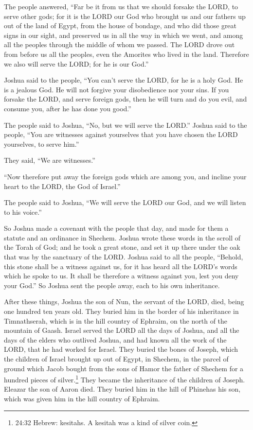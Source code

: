 \myverse{}The people answered, “Far be it from us that we should forsake
the LORD, to serve other gods;
\myverse{}for it is the LORD our God who brought us and our fathers up out of the land
of Egypt, from the house of bondage, and who did those great signs in our sight, and preserved us in all
the way in which we went, and among all the peoples through the middle of whom we passed.
\myverse{}The LORD drove out from before us all the peoples, even the Amorites who
lived in the land. Therefore we also will serve the LORD; for he is our God.”

\myverse{}Joshua said to the people, “You can’t serve the LORD, for he
is a holy God. He is a jealous God. He will not forgive your disobedience nor your sins.
\myverse{}If you forsake the LORD, and serve foreign gods, then he will turn and do
you evil, and consume you, after he has done you good.”

\myverse{}The people said to Joshua, “No, but we will serve the LORD.”
\myverse{}Joshua said to the people, “You are witnesses against yourselves that you
have chosen the LORD yourselves, to serve him.”

They said, “We are witnesses.”

\myverse{}“Now therefore put away the foreign gods which are among you,
and incline your heart to the LORD, the God of Israel.”

\myverse{}The people said to Joshua, “We will serve the LORD our God,
and we will listen to his voice.”

\myverse{}So Joshua made a covenant with the people that day, and made
for them a statute and an ordinance in Shechem.
\myverse{}Joshua wrote these words in the scroll of the Torah of God; and he took a
great stone, and set it up there under the oak that was by the sanctuary of the LORD.
\myverse{}Joshua said to all the people, “Behold, this stone shall be a witness against
us, for it has heard all the LORD’s words which he spoke to us. It shall be therefore a witness against
you, lest you deny your God.”
\myverse{}So Joshua sent the people away, each to his own inheritance.

\myverse{}After these things, Joshua the son of Nun, the servant of the
LORD, died, being one hundred ten years old.
\myverse{}They buried him in the border of his inheritance in Timnathserah, which is
in the hill country of Ephraim, on the north of the mountain of Gaash.
\myverse{}Israel served the LORD all the days of Joshua, and all the days of the elders
who outlived Joshua, and had known all the work of the LORD, that he had worked for Israel.
\myverse{}They buried the bones of Joseph, which the children of Israel brought up
out of Egypt, in Shechem, in the parcel of ground which Jacob bought from the sons of Hamor the father
of Shechem for a hundred pieces of silver.\footnote{24:32 Hebrew: kesitahs. A kesitah was a kind of silver coin.} They became the inheritance of
the children of Joseph.
\myverse{}Eleazar the son of Aaron died. They buried him in the hill of Phinehas his
son, which was given him in the hill country of Ephraim.


